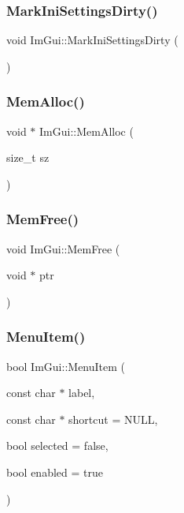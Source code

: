 \hypertarget{namespace_im_gui_aee9b660c1d6786c00fc47c71c66eb1eb}{}\label{namespace_im_gui_aee9b660c1d6786c00fc47c71c66eb1eb} 
\subsubsection{\texorpdfstring{Mark\+Ini\+Settings\+Dirty()}{MarkIniSettingsDirty()}}
{\footnotesize\ttfamily void Im\+Gui\+::\+Mark\+Ini\+Settings\+Dirty (\begin{DoxyParamCaption}{ }\end{DoxyParamCaption})}

\hypertarget{namespace_im_gui_a15efb2cac4a54b35489c5984ba1b661a}{}\label{namespace_im_gui_a15efb2cac4a54b35489c5984ba1b661a} 
\subsubsection{\texorpdfstring{Mem\+Alloc()}{MemAlloc()}}
{\footnotesize\ttfamily void $\ast$ Im\+Gui\+::\+Mem\+Alloc (\begin{DoxyParamCaption}\item[{size\+\_\+t}]{sz }\end{DoxyParamCaption})}

\hypertarget{namespace_im_gui_a269ec695c6e722ec3da85dae37f0675d}{}\label{namespace_im_gui_a269ec695c6e722ec3da85dae37f0675d} 
\subsubsection{\texorpdfstring{Mem\+Free()}{MemFree()}}
{\footnotesize\ttfamily void Im\+Gui\+::\+Mem\+Free (\begin{DoxyParamCaption}\item[{void $\ast$}]{ptr }\end{DoxyParamCaption})}

\hypertarget{namespace_im_gui_aa1bae511ca47478998693a9d8c84f2e6}{}\label{namespace_im_gui_aa1bae511ca47478998693a9d8c84f2e6} 
\subsubsection{\texorpdfstring{Menu\+Item()}{MenuItem()}\hspace{0.1cm}{\footnotesize\ttfamily [1/2]}}
{\footnotesize\ttfamily bool Im\+Gui\+::\+Menu\+Item (\begin{DoxyParamCaption}\item[{const char $\ast$}]{label,  }\item[{const char $\ast$}]{shortcut = {\ttfamily NULL},  }\item[{bool}]{selected = {\ttfamily false},  }\item[{bool}]{enabled = {\ttfamily true} }\end{DoxyParamCaption})}

